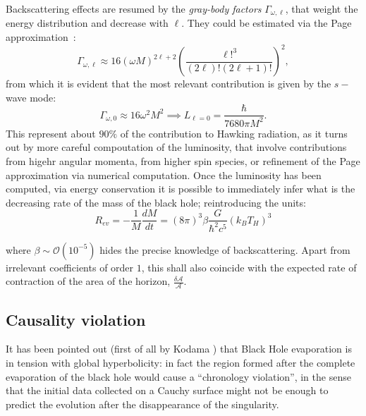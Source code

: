 Backscattering effects are resumed by the \emph{gray-body factors} \(\Gamma_{\omega, \ell}\), that weight the energy distribution and decrease with \(\ell\). They could be estimated via the Page approximation~\cite[]{page1976particle}:
\[
	\Gamma_{\omega,\ell} \approx 16(\omega M)^{2\ell + 2}\left(\frac{\ell!^3}{(2\ell)!(2\ell + 1)!}\right)^2,
\]
from which it is evident that the most relevant contribution is given by the \(s-\)wave mode:
\[
\Gamma_{\omega, 0} \approx 16\omega^2M^2 \implies L_{\ell = 0} = \frac{\hbar}{7680\pi M^2}.
\]
This represent about \(90\%\) of the contribution to Hawking radiation, as it turns out by more careful compoutation of the luminosity, that involve contributions from higehr angular momenta, from higher spin species, or refinement of the Page approximation via numerical computation.
Once the luminosity has been computed, via energy conservation it is possible to immediately infer what is the decreasing rate of the mass of the black hole; reintroducing the units:
\begin{equation}
	\label{eq:evaporation-rate}
	R_{ev} = -\frac{1}{M}\frac{dM}{dt} = (8\pi)^3\beta \frac{G}{\hbar^2c^5}\left(k_BT_H\right)^3
\end{equation}

where \(\beta \sim \mathcal{O}(10^{-5})\) hides the precise knowledge of backscattering. Apart from irrelevant coefficients of order \(1\), this shall also coincide with the expected rate of contraction of the area of the horizon, \(\frac{\delta\mathcal{A}}{\mathcal{A}}\).


\subsection{Causality violation}
\label{subsec:causaliy-bh-evaporation}
It has been pointed out (first of all by Kodama \cite{Kodama:1979vm}) that Black Hole evaporation is in tension with global hyperbolicity: in fact the region formed after the complete evaporation of the black hole would cause a ``chronology violation'', in the sense that the initial data collected on a Cauchy surface might not be enough to predict the evolution after the disappearance of the singularity.

